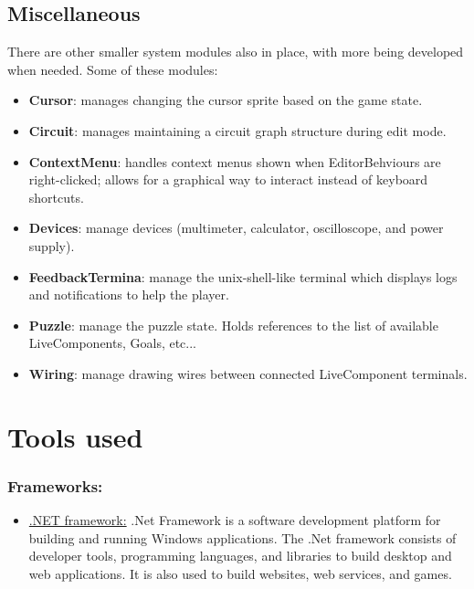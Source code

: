 \documentclass[../main.tex]{subfiles}
\begin{document}
\subsection{Miscellaneous}
There are other smaller system modules also in place, with more being developed when needed. Some of these modules:
\begin{itemize}
    \item \textbf{Cursor}: manages changing the cursor sprite based on the game state.
    \item \textbf{Circuit}: manages maintaining a circuit graph structure during edit mode. 
    \item \textbf{ContextMenu}: handles context menus shown when EditorBehviours are right-clicked; allows for a graphical way to interact instead of keyboard shortcuts.
    \item \textbf{Devices}: manage devices (multimeter, calculator, oscilloscope, and power supply).
    \item \textbf{FeedbackTermina}: manage the unix-shell-like terminal which displays logs and notifications to help the player.
    \item \textbf{Puzzle}: manage the puzzle state. Holds references to the list of available LiveComponents, Goals, etc...
    \item \textbf{Wiring}: manage drawing wires between connected LiveComponent terminals.
\end{itemize}

\section{Tools used}
\subsubsection{Frameworks:}
\begin{itemize}
    \item \underline{.NET framework:} .Net Framework is a software development platform for building and running Windows applications. The .Net framework consists of developer tools, programming languages, and libraries to build desktop and web applications. It is also used to build websites, web services, and games. 
\end{itemize}
\end{document}
